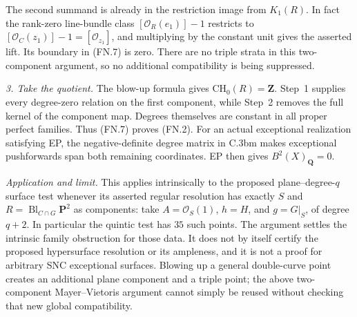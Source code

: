 The second summand is already in the restriction image from
$K_1(R)$. In fact the rank-zero line-bundle class
$[\mathcal O_R(e_1)]-1$ restricts to
$[\mathcal O_C(z_1)]-1=[\mathcal O_{z_1}]$, and multiplying
by the constant unit gives the asserted lift. Its boundary
in (FN.7) is zero. There are no triple strata in this two-component
argument, so no additional compatibility is being suppressed.

\emph{3. Take the quotient.}
The blow-up formula gives
$\mathrm{CH}_0(R)=\mathbf Z$. Step~1 supplies every degree-zero
relation on the first component, while Step~2 removes the full
kernel of the component map. Degrees themselves are constant
in all proper perfect families. Thus (FN.7) proves (FN.2).
For an actual exceptional realization satisfying EP, the
negative-definite degree matrix in C.3bm makes exceptional
pushforwards span both remaining coordinates. EP then gives
$B^2(X)_{\mathbf Q}=0$.

\emph{Application and limit.}
This applies intrinsically to the proposed plane--degree-$q$
surface test whenever its asserted regular resolution has
exactly $S$ and $R=\operatorname{Bl}_{C\cap G}\mathbf P^2$
as components: take $A=\mathcal O_S(1)$, $h=H$, and
$g=G|_S$, of degree $q+2$. In particular the quintic test has
$35$ such points. The argument settles the intrinsic family
obstruction for those data. It does not by itself certify the
proposed hypersurface resolution or its ampleness, and it is
not a proof for arbitrary SNC exceptional surfaces. Blowing
up a general double-curve point creates an additional plane
component and a triple point; the above two-component
Mayer--Vietoris argument cannot simply be reused without
checking that new global compatibility.
